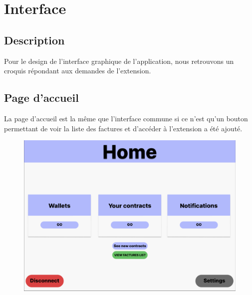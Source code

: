 \section{Interface}
\subsection{Description}

\begin{flushleft}
Pour le design de l'interface graphique de l'application, nous retrouvons un croquis répondant aux demandes de l'extension.
\end{flushleft}

\subsection{Page d'accueil}
\begin{flushleft}
La page d'accueil est la même que l'interface commune si ce n'est qu'un bouton permettant de voir la liste des factures et d'accéder à l'extension a été ajouté.
\end{flushleft}
\begin{figure}[h]
\centering
\includegraphics[width = 1\textwidth]{extension-maxime/interface/img/home.png}
\end{figure}

